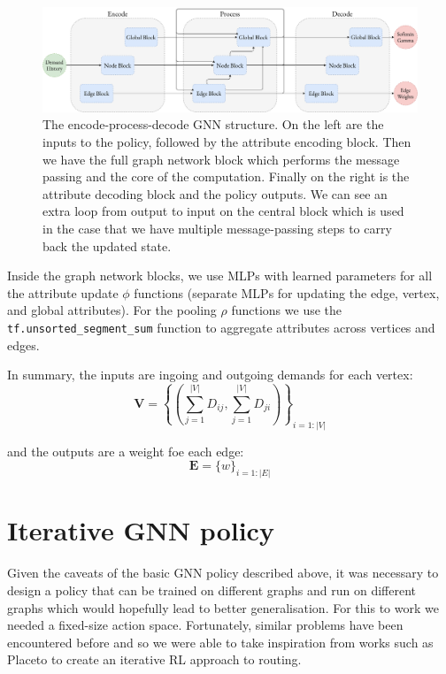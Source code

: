 \begin{figure}
    \centering
    \includegraphics[width=\textwidth]{figures/encode_process_decode.pdf}
    \caption{The encode-process-decode GNN structure. On the left are the inputs to the policy, followed by the attribute encoding block. Then we have the full graph network block which performs the message passing and the core of the computation. Finally on the right is the attribute decoding block and the policy outputs. We can see an extra loop from output to input on the central block which is used in the case that we have multiple message-passing steps to carry back the updated state.}
    \label{fig:encode_process_decode}
\end{figure}

Inside the graph network blocks, we use MLPs with learned parameters for all the attribute update $\phi$ functions (separate MLPs for updating the edge, vertex, and global attributes). For the pooling $\rho$ functions we use the \texttt{tf.unsorted\_segment\_sum} function to aggregate attributes across vertices and edges.

In summary, the inputs are ingoing and outgoing demands for each vertex:
\begin{equation}
  \label{equation:node_inputs}
  \bm{V} = \left\{\left(\sum_{j=1}^{|V|}{D_{ij}}, \sum_{j=1}^{|V|}{D_{ji}}\right)\right\}_{i=1:|V|}
\end{equation}

and the outputs are a weight foe each edge:
\begin{equation}
  \label{equation:edge_outputs}
  \bm{E} = \{w\}_{i=1:|E|}
\end{equation}


\section{Iterative GNN policy}
\label{section:gnn_iterative}
Given the caveats of the basic GNN policy described above, it was necessary to design a policy that can be trained on different graphs and run on different graphs which would hopefully lead to better generalisation. For this to work we needed a fixed-size action space. Fortunately, similar problems have been encountered before and so we were able to take inspiration from works such as Placeto\cite{venkatakrishnan2019learning} to create an iterative RL approach to routing.

